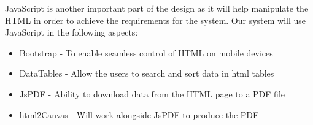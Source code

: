 \documentclass[../main.tex]{subfiles}
\begin{document}
\raggedright
JavaScript is another important part of the design as it will help manipulate the HTML in order to achieve the requirements for the system. Our system will use JavaScript in the following aspects:
\begin{itemize}
	\item Bootstrap\cite{boostrapfour} - To enable seamless control of HTML on mobile devices
	\item DataTables\cite{datatables} - Allow the users to search and sort data in html tables
	\item JsPDF\cite{jsPDF} - Ability to download data from the HTML page to a PDF file
	\item html2Canvas\cite{htmlcanvas} - Will work alongside JsPDF to produce the PDF
\end{itemize}
\end{document}
